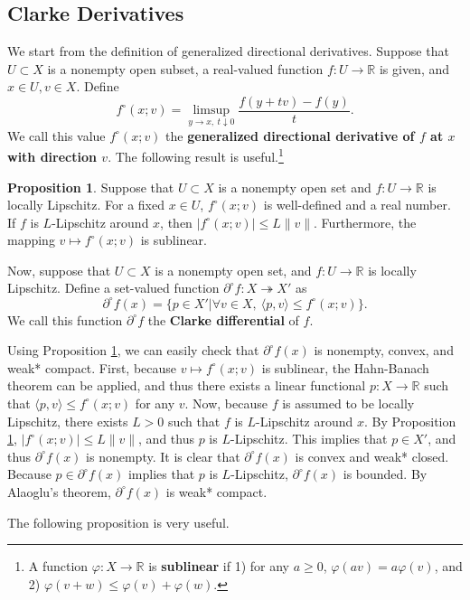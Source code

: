 \documentclass[a4paper,12pt]{article}
\theoremstyle{definition}
\newtheorem{prop}{Proposition}
\begin{document}
\subsection{Clarke Derivatives}
We start from the definition of generalized directional derivatives. Suppose that $U\subset X$ is a nonempty open subset, a real-valued function $f:U\to \mathbb{R}$ is given, and $x\in U, v\in X$. Define
\[f^{\circ}(x;v)=\limsup_{y\to x,\ t\downarrow 0}\frac{f(y+tv)-f(y)}{t}.\]
We call this value $f^{\circ}(x;v)$ the {\bf generalized directional derivative of $f$ at $x$ with direction $v$}. The following result is useful.\footnote{A function $\varphi:X\to \mathbb{R}$ is {\bf sublinear} if 1) for any $a\ge 0$, $\varphi(av)=a\varphi(v)$, and 2) $\varphi(v+w)\le \varphi(v)+\varphi(w)$.}

\begin{prop}\label{prop2}
Suppose that $U\subset X$ is a nonempty open set and $f:U\to \mathbb{R}$ is locally Lipschitz. For a fixed $x\in U$, $f^{\circ}(x;v)$ is well-defined and a real number. If $f$ is $L$-Lipschitz around $x$, then $|f^{\circ}(x;v)|\le L\|v\|$. Furthermore, the mapping $v\mapsto f^{\circ}(x;v)$ is sublinear.
\end{prop}

Now, suppose that $U\subset X$ is a nonempty open set, and $f:U\to \mathbb{R}$ is locally Lipschitz. Define a set-valued function $\partial^{\circ}f:X\twoheadrightarrow X'$ as
\[\partial^{\circ}f(x)=\{p\in X'|\forall v\in X,\ \langle p,v\rangle \le f^{\circ}(x;v)\}.\]
We call this function $\partial^{\circ}f$ the {\bf Clarke differential} of $f$.

Using Proposition \ref{prop2}, we can easily check that $\partial^{\circ}f(x)$ is nonempty, convex, and weak* compact. First, because $v\mapsto f^{\circ}(x;v)$ is sublinear, the Hahn-Banach theorem can be applied, and thus there exists a linear functional $p:X\to \mathbb{R}$ such that $\langle p,v\rangle\le f^{\circ}(x;v)$ for any $v$. Now, because $f$ is assumed to be locally Lipschitz, there exists $L>0$ such that $f$ is $L$-Lipschitz around $x$. By Proposition \ref{prop2}, $|f^{\circ}(x;v)|\le L\|v\|$, and thus $p$ is $L$-Lipschitz. This implies that $p\in X'$, and thus $\partial^{\circ}f(x)$ is nonempty. It is clear that $\partial^{\circ}f(x)$ is convex and weak* closed. Because $p\in \partial^{\circ}f(x)$ implies that $p$ is $L$-Lipschitz, $\partial^{\circ}f(x)$ is bounded. By Alaoglu's theorem, $\partial^{\circ}f(x)$ is weak* compact.

The following proposition is very useful.
\end{document}
